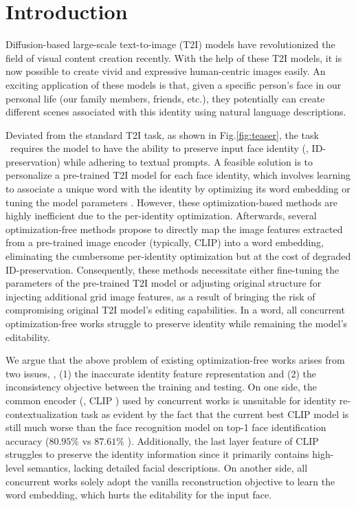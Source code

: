 \section{Introduction}\label{sec:intro}

Diffusion-based large-scale text-to-image (T2I) models \cite{ramesh2022hierarchical, saharia2022photorealistic, rombach2022high} have revolutionized the field of visual content creation recently. With the help of these T2I models, it is now possible to create vivid and expressive human-centric images easily. An exciting application of these models is that, given a specific person's face in our personal life (our family members, friends, etc.), they potentially can create different scenes associated with this identity using natural language descriptions.

Deviated from the standard T2I task, as shown in Fig.\ref{fig:teaser}, the task \task \ requires the model to have the ability to preserve input face identity (\ie, ID-preservation) while adhering to textual prompts. A feasible solution is to personalize a pre-trained T2I model \cite{gal2022image, ruiz2022dreambooth, kumari2022multi} for each face identity, which involves learning to associate a unique word with the identity by optimizing its word embedding \cite{gal2022image} or tuning the model parameters \cite{ruiz2022dreambooth, kumari2022multi}. However, these optimization-based methods are highly inefficient due to the per-identity optimization. Afterwards, several optimization-free methods \cite{wei2023elite, shi2023instantbooth, ma2023unified} propose to directly map the image features extracted from a pre-trained image encoder (typically, CLIP) into a word embedding, eliminating the cumbersome per-identity optimization but at the cost of degraded ID-preservation. Consequently, these methods necessitate either fine-tuning the parameters of the pre-trained T2I model \cite{gal2023designing} or adjusting original structure for injecting additional grid image features, as a result of bringing the risk of compromising original T2I model's editing capabilities. In a word, all concurrent optimization-free works struggle to preserve identity while remaining the model's editability.



We argue that the above problem of existing optimization-free works arises from  two issues, \ie, (1) the inaccurate identity feature representation and (2) the inconsistency objective between the  training and testing. On one side, the common encoder (\ie, CLIP \cite{radford2021learning}) used by concurrent works \cite{wei2023elite, shi2023instantbooth, ma2023unified, gal2023designing} is unsuitable for identity re-contextualization task as evident by the fact that the current best CLIP model is still much worse than the face recognition model on top-1 face identification accuracy ($80.95\%$ vs $87.61\%$ \cite{bhat2023face}). Additionally, the last layer feature of CLIP struggles to preserve the identity information since it primarily contains high-level semantics, lacking detailed facial descriptions. On another side, all concurrent works solely adopt the vanilla reconstruction objective to learn the word embedding, which hurts the editability for the input face.

